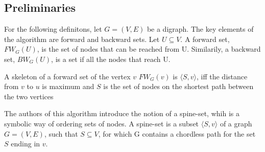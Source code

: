 \documentclass[../master.tex]{subfiles}
\newcommand{\FW}[2][G]{\ensuremath{FW_{#1}(#2)}}
\newcommand{\BW}[2][G]{\ensuremath{BW_{#1}(#2)}}
\begin{document}
\subsection{Preliminaries}
 For the following definitons, let $G=(V,E)$ be a digraph.
The key elements of the algorithm are forward and backward sets. Let $U\subseteq V$. A forward set, \FW{U}, is the set of nodes that can be reached from U. Similarily, a backward set, \BW{U}, is a set if all the nodes that reach U.

A skeleton of a forward set of the vertex $v$ \FW{v} is $\langle S, v \rangle$, iff the distance from $v$ to $u$ is maximum and $S$ is the set of nodes on the shortest path between the two vertices

The authors of this algorithm introduce the notion of a spine-set, whih is a symbolic way of ordering sets of nodes. A spine-set is a subset $\langle S, v\rangle$ of a graph $G=(V,E)$, such that $S\subseteq V$, for which G contains a chordless path for the set $S$ ending in $v$.
\end{document}

